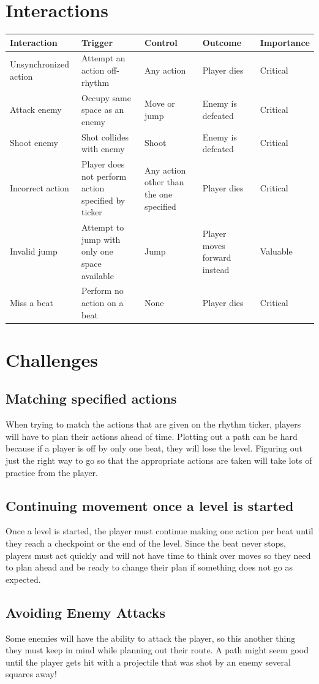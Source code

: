\documentclass[]{article}
\begin{document}
\section*{Interactions}
\begin{table}[h]
\begin{tabular}{|l|L{4cm}|L{2cm}|L{3cm}|l|}
\hline
\textbf{Interaction} & \textbf{Trigger} & \textbf{Control}  & \textbf{Outcome} & \textbf{Importance} \\
\hline
Unsynchronized action & Attempt an action off-rhythm & Any action & Player dies & Critical \\
\hline 
Attack enemy & Occupy same space as an enemy & Move or jump & Enemy is defeated & Critical \\
\hline
Shoot enemy & Shot collides with enemy & Shoot & Enemy is defeated & Critical \\
\hline
Incorrect action & Player does not perform action specified by ticker & Any action other than the one specified & Player dies  & Critical \\
\hline
Invalid jump     & Attempt to jump with only one space available      & Jump   & Player moves forward instead & Valuable \\
\hline
Miss a beat      & Perform no action on a beat      & None       & Player dies       & Critical\\
\hline
\end{tabular}
\end{table}

\pagebreak
\section*{Challenges}
\subsection*{Matching specified actions}
When trying to match the actions that are given on the rhythm ticker,
players will have to plan their actions ahead of time. Plotting out a
path can be hard because if a player is off by only one beat, they
will lose the level. Figuring out just the right way to go so that the
appropriate actions are taken will take lots of practice from the
player.
\subsection*{Continuing movement once a level is started}
Once a level is started, the player must continue making one action
per beat until they reach a checkpoint or the end of the level. Since
the beat never stops, players must act quickly and will not have time
to think over moves so they need to plan ahead and be ready to change
their plan if something does not go as expected.
\subsection*{Avoiding Enemy Attacks}
Some enemies will have the ability to attack the player, so this
another thing they must keep in mind while planning out their route. A
path might seem good until the player gets hit with a projectile that
was shot by an enemy several squares away!
\end{document}

